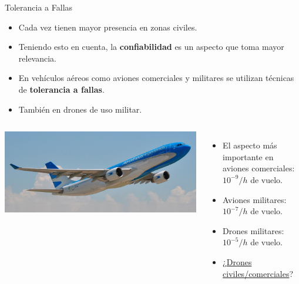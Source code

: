 \begin{frame}{Tolerancia a Fallas}
	\begin{itemize}
		\item<1->Cada vez tienen mayor presencia en zonas civiles.
		\item<2->Teniendo esto en cuenta, la \textbf{confiabilidad} es un aspecto que toma mayor relevancia.
		\item<3->En vehículos aéreos como aviones comerciales y militares se utilizan técnicas de \textbf{tolerancia a fallas}.
		\item<5->También en drones de uso militar.
	\end{itemize}
    \begin{columns}
			\includegraphics[width=\textwidth]{img/avion_comercial.jpg}
            \begin{itemize}
            	\item<6->El aspecto más importante en aviones comerciales: $10^{-9}/h$ de vuelo.
            	\item<7->Aviones militares: $10^{-7}/h$ de vuelo.
            	\item<8->Drones militares: $10^{-5}/h$ de vuelo.
            	\item<9->¿\underline{Drones civiles/comerciales}?
            \end{itemize}
    \end{columns}
\end{frame}

